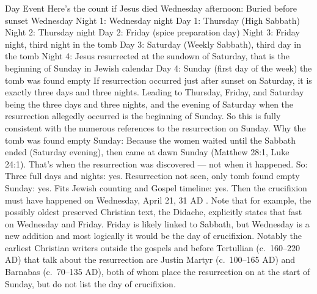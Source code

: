 Day Event Here’s the count if Jesus died Wednesday afternoon: Buried before sunset Wednesday Night 1: Wednesday night Day 1: Thursday (High Sabbath) Night 2: Thursday night Day 2: Friday (spice preparation day) Night 3: Friday night, third night in the tomb Day 3: Saturday (Weekly Sabbath), third day in the tomb Night 4: Jesus resurrected at the sundown of Saturday, that is the beginning of Sunday in Jewish calendar Day 4: Sunday (first day of the week) the tomb was found empty If resurrection occurred just after sunset on Saturday, it is exactly three days and three nights.
Leading to Thursday, Friday, and Saturday being the three days and three nights, and the evening of Saturday when the resurrection allegedly occurred is the beginning of Sunday.
So this is fully consistent with the numerous references to the resurrection on Sunday.
Why the tomb was found empty Sunday: Because the women waited until the Sabbath ended (Saturday evening), then came at dawn Sunday (Matthew 28:1, Luke 24:1).
That’s when the resurrection was discovered — not when it happened.
So: Three full days and nights: yes.
Resurrection not seen, only tomb found empty Sunday: yes.
Fits Jewish counting and Gospel timeline: yes.
Then the crucifixion must have happened on Wednesday, April 21, 31 AD .
Note that for example, the possibly oldest preserved Christian text, the Didache, explicitly states that fast on Wednesday and Friday.
Friday is likely linked to Sabbath, but Wednesday is a new addition and most logically it would be the day of crucifixion.
Notably the earliest Christian writers outside the gospels and before Tertullian (c.~160–220 AD) that talk about the resurrection are Justin Martyr (c.~100–165 AD) and Barnabas (c.~70–135 AD), both of whom place the resurrection on at the start of Sunday, but do not list the day of crucifixion.
